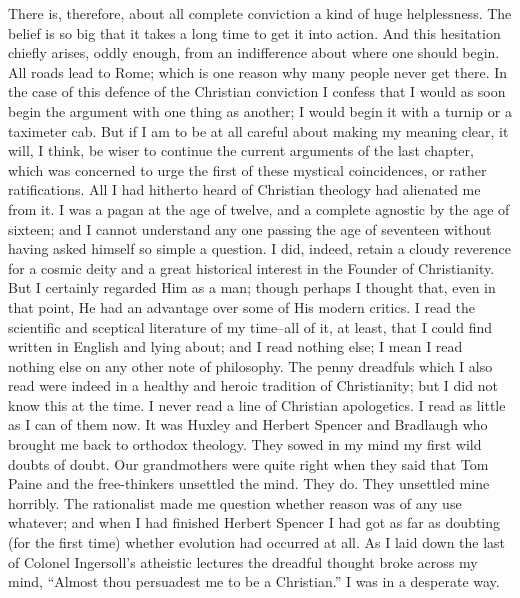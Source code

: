 \documentclass{book}
\begin{document}
There is, therefore, about all complete conviction a kind of huge helplessness. The belief is so big that it takes a long time to get it into action. And this hesitation chiefly arises, oddly enough, from an indifference about where one should begin. All roads lead to Rome; which is one reason why many people never get there. In the case of this defence of the Christian conviction I confess that I would as soon begin the argument with one thing as another; I would begin it with a turnip or a taximeter cab. But if I am to be at all careful about making my meaning clear, it will, I think, be wiser to continue the current arguments of the last chapter, which was concerned to urge the first of these mystical coincidences, or rather ratifications. All I had hitherto heard of Christian theology had alienated me from it. I was a pagan at the age of twelve, and a complete agnostic by the age of sixteen; and I cannot understand any one passing the age of seventeen without having asked himself so simple a question. I did, indeed, retain a cloudy reverence for a cosmic deity and a great historical interest in the Founder of Christianity. But I certainly regarded Him as a man; though perhaps I thought that, even in that point, He had an advantage over some of His modern critics. I read the scientific and sceptical literature of my time–all of it, at least, that I could find written in English and lying about; and I read nothing else; I mean I read nothing else on any other note of philosophy. The penny dreadfuls which I also read were indeed in a healthy and heroic tradition of Christianity; but I did not know this at the time. I never read a line of Christian apologetics. I read as little as I can of them now. It was Huxley and Herbert Spencer and Bradlaugh who brought me back to orthodox theology. They sowed in my mind my first wild doubts of doubt. Our grandmothers were quite right when they said that Tom Paine and the free-thinkers unsettled the mind. They do. They unsettled mine horribly. The rationalist made me question whether reason was of any use whatever; and when I had finished Herbert Spencer I had got as far as doubting (for the first time) whether evolution had occurred at all. As I laid down the last of Colonel Ingersoll’s atheistic lectures the dreadful thought broke across my mind, “Almost thou persuadest me to be a Christian.” I was in a desperate way.
\end{document}
